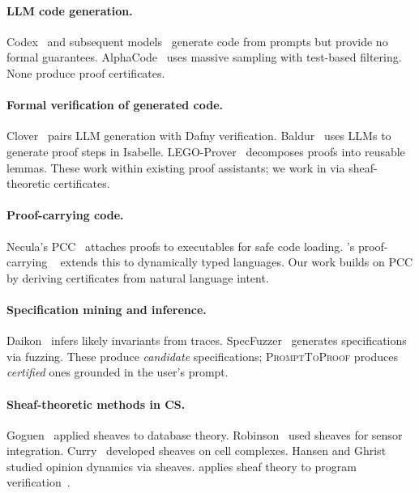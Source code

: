 \documentclass[11pt]{article}
\newcommand{\PromptToProof}{\textsc{PromptToProof}}
\begin{document}
\paragraph{LLM code generation.}
Codex~\cite{Chen2021Codex} and subsequent models~\cite{Li2023StarCoder,
Roziere2023CodeLlama} generate code from prompts but provide no formal
guarantees.  AlphaCode~\cite{Li2022AlphaCode} uses massive sampling
with test-based filtering.  None produce proof certificates.

\paragraph{Formal verification of generated code.}
Clover~\cite{Sun2024Clover} pairs LLM generation with Dafny
verification.  Baldur~\cite{First2023Baldur} uses LLMs to generate
proof steps in Isabelle.  LEGO-Prover~\cite{Wang2024LEGOProver}
decomposes proofs into reusable lemmas.  These work within existing
proof assistants; we work in \Python{} via sheaf-theoretic certificates.

\paragraph{Proof-carrying code.}
Necula's PCC~\cite{Necula1997PCC} attaches proofs to executables for
safe code loading.  \JuGeo{}'s proof-carrying
\Python{}~\cite{Young2025pcp} extends this to dynamically typed
languages.  Our work builds on PCC by deriving certificates from
natural language intent.

\paragraph{Specification mining and inference.}
Daikon~\cite{Ernst2007Daikon} infers likely invariants from traces.
SpecFuzzer~\cite{Molina2022SpecFuzzer} generates specifications via
fuzzing.  These produce \emph{candidate} specifications;
\PromptToProof{} produces \emph{certified} ones grounded in the
user's prompt.

\paragraph{Sheaf-theoretic methods in CS.}
Goguen~\cite{Goguen1992Sheaves} applied sheaves to database theory.
Robinson~\cite{Robinson2014Topological} used sheaves for sensor
integration.  Curry~\cite{Curry2014Sheaves} developed sheaves on cell
complexes.  Hansen and Ghrist~\cite{Hansen2019Toward} studied
opinion dynamics via sheaves.  \JuGeo{} applies sheaf theory to
program verification~\cite{Young2025seminal,Young2025sites}.
\end{document}
